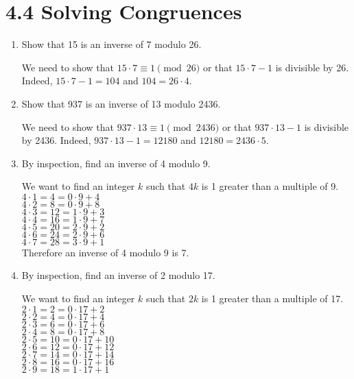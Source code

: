 \documentclass[11pt]{article}
\begin{document}
\section*{\textbf{4.4 Solving Congruences}}
\begin{enumerate}[label=\textbf{\arabic*.}]
	\item Show that 15 is an inverse of 7 modulo 26.
	
	We need to show that $15 \cdot 7 \equiv 1 \pmod{26}$ or that $15 \cdot 7 - 1$ is divisible by 26. Indeed, $15 \cdot 7 - 1 = 104$ and $104 = 26 \cdot 4$.
	
	\item Show that 937 is an inverse of 13 modulo 2436.
	
	We need to show that $937 \cdot 13 \equiv 1 \pmod{2436}$ or that $937 \cdot 13 - 1$ is divisible by 2436. Indeed, $937 \cdot 13 - 1 = 12180$ and $12180 = 2436 \cdot 5$.
	
	\item By inspection, find an inverse of 4 modulo 9.
	
	We want to find an integer $k$ such that $4k$ is 1 greater than a multiple of 9. \\
	
	$4 \cdot 1 = 4 = 0 \cdot 9 + 4$ \\
	$4 \cdot 2 = 8 = 0 \cdot 9 + 8$ \\
	$4 \cdot 3 = 12 = 1 \cdot 9 + 3$ \\
	$4 \cdot 4 = 16 = 1 \cdot 9 + 7$ \\
	$4 \cdot 5 = 20 = 2 \cdot 9 + 2$ \\
	$4 \cdot 6 = 24 = 2 \cdot 9 + 6$ \\
	$4 \cdot 7 = 28 = 3 \cdot 9 + 1$ \\
	
	Therefore an inverse of 4 modulo 9 is 7.	
	
	\item By inspection, find an inverse of 2 modulo 17.
	
	We want to find an integer $k$ such that $2k$ is 1 greater than a multiple of 17. \\
	
	$2 \cdot 1 = 2 = 0 \cdot 17 + 2$ \\
	$2 \cdot 2 = 4 = 0 \cdot 17 + 4$ \\
	$2 \cdot 3 = 6 = 0 \cdot 17 + 6$ \\
	$2 \cdot 4 = 8 = 0 \cdot 17 + 8$ \\
	$2 \cdot 5 = 10 = 0 \cdot 17 + 10$ \\
	$2 \cdot 6 = 12 = 0 \cdot 17 + 12$ \\
	$2 \cdot 7 = 14 = 0 \cdot 17 + 14$ \\
	$2 \cdot 8 = 16 = 0 \cdot 17 + 16$ \\
	$2 \cdot 9 = 18 = 1 \cdot 17 + 1$ \\
	

\end{enumerate}
\end{document}
